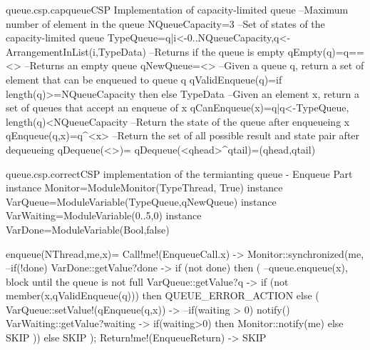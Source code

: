 \documentclass[a4paper, 12pt]{article}
\begin{document}
\begin{cspfloat}{queue.csp.capqueue}{CSP Implementation of capacity-limited queue}
--Maximum number of element in the queue
NQueueCapacity=3
--Set of states of the capacity-limited queue
TypeQueue={q|i<-{0..NQueueCapacity},q<-ArrangementInList(i,TypeData)}
--Returns if the queue is empty
qEmpty(q)=q==<>
--Returns an empty queue
qNewQueue=<>
--Given a queue q, return a set of element that can be enqueued to queue q
qValidEnqueue(q)=if length(q)>=NQueueCapacity then {} else TypeData
--Given an element x, return a set of queues that accept an enqueue of x
qCanEnqueue(x)={q|q<-TypeQueue, length(q)<NQueueCapacity}
--Return the state of the queue after enqueueing x
qEnqueue(q,x)=q^<x>
--Return the set of all possible result and state pair after dequeueing
qDequeue(<>)={}
qDequeue(<qhead>^qtail)={(qhead,qtail)}
\end{cspfloat}

\begin{cspfloat}{queue.csp.correct}{CSP implementation of the termianting queue - Enqueue Part}
instance Monitor=ModuleMonitor(TypeThread, True)
instance VarQueue=ModuleVariable(TypeQueue,qNewQueue)
instance VarWaiting=ModuleVariable({0..5},0)
instance VarDone=ModuleVariable(Bool,false)

enqueue(NThread,me,x)=
  Call!me!(EnqueueCall.x) ->
  Monitor::synchronized(me,
    --if(!done)
    VarDone::getValue?done ->
    if (not done) then (
      --queue.enqueue(x), block until the queue is not full
      VarQueue::getValue?q ->
      if (not member(x,qValidEnqueue(q))) then QUEUE_ERROR_ACTION
      else (
        VarQueue::setValue!(qEnqueue(q,x)) ->
        --if(waiting > 0) notify()
        VarWaiting::getValue?waiting ->
        if(waiting>0) then Monitor::notify(me) else SKIP
    )) else SKIP
  );
  Return!me!(EnqueueReturn) ->
  SKIP






















  ⠀
\end{cspfloat}
\end{document}
